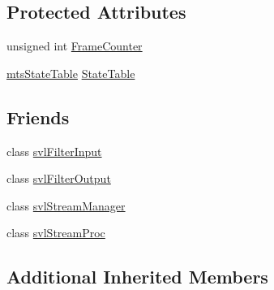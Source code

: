 \subsection*{Protected Attributes}
\begin{DoxyCompactItemize}
\item 
unsigned int \hyperlink{classsvl_filter_base_ab12326fbaf20f3fe944aaa675a414c01}{Frame\-Counter}
\item 
\hyperlink{classmts_state_table}{mts\-State\-Table} \hyperlink{classsvl_filter_base_a4abb6f966a72129f536745763e71820b}{State\-Table}
\end{DoxyCompactItemize}
\subsection*{Friends}
\begin{DoxyCompactItemize}
\item 
class \hyperlink{classsvl_filter_base_a06b5f90c7191f0b22855f56d089948fa}{svl\-Filter\-Input}
\item 
class \hyperlink{classsvl_filter_base_a3f45c3511fc124d190c8ffb5953025f6}{svl\-Filter\-Output}
\item 
class \hyperlink{classsvl_filter_base_ab5eee58544f2ce644140e932afbe32db}{svl\-Stream\-Manager}
\item 
class \hyperlink{classsvl_filter_base_a6a9ee1dec5ca263793dca09411295245}{svl\-Stream\-Proc}
\end{DoxyCompactItemize}
\subsection*{Additional Inherited Members}


